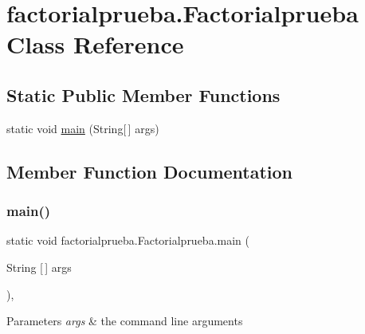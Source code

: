 \hypertarget{classfactorialprueba_1_1_factorialprueba}{}\section{factorialprueba.\+Factorialprueba Class Reference}
\label{classfactorialprueba_1_1_factorialprueba}
\subsection*{Static Public Member Functions}
\begin{DoxyCompactItemize}
\item 
static void \mbox{\hyperlink{classfactorialprueba_1_1_factorialprueba_afbef60fa05454cbd3a06ee7dccee8d8e}{main}} (String\mbox{[}$\,$\mbox{]} args)
\end{DoxyCompactItemize}


\subsection{Member Function Documentation}
\mbox{\label{classfactorialprueba_1_1_factorialprueba_afbef60fa05454cbd3a06ee7dccee8d8e}} 
\subsubsection{\texorpdfstring{main()}{main()}}
{\footnotesize\ttfamily static void factorialprueba.\+Factorialprueba.\+main (\begin{DoxyParamCaption}\item[{String \mbox{[}$\,$\mbox{]}}]{args }\end{DoxyParamCaption})\hspace{0.3cm}{\ttfamily [inline]}, {\ttfamily [static]}}


\begin{DoxyParams}{Parameters}
{\em args} & the command line arguments \\
\hline
\end{DoxyParams}

